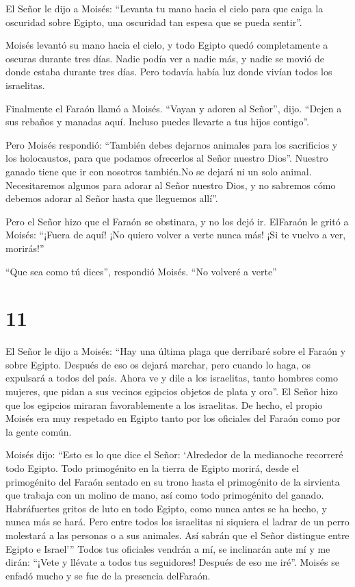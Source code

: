  El Señor le dijo a Moisés: ``Levanta tu mano hacia el
cielo para que caiga la oscuridad sobre Egipto, una oscuridad tan espesa
que se pueda sentir''.

 Moisés levantó su mano hacia el cielo, y todo Egipto quedó
completamente a oscuras durante tres días.  Nadie podía ver
a nadie más, y nadie se movió de donde estaba durante tres días. Pero
todavía había luz donde vivían todos los israelitas.

 Finalmente el Faraón llamó a Moisés. ``Vayan y adoren al
Señor'', dijo. ``Dejen a sus rebaños y manadas aquí. Incluso puedes
llevarte a tus hijos contigo''.

 Pero Moisés respondió: ``También debes dejarnos animales
para los sacrificios y los holocaustos, para que podamos ofrecerlos al
Señor nuestro Dios''.  Nuestro ganado tiene que ir con
nosotros también.No se dejará ni un solo animal. Necesitaremos algunos
para adorar al Señor nuestro Dios, y no sabremos cómo debemos adorar al
Señor hasta que lleguemos allí''.

 Pero el Señor hizo que el Faraón se obstinara, y no los
dejó ir.  ElFaraón le gritó a Moisés: ``¡Fuera de aquí! ¡No
quiero volver a verte nunca más! ¡Si te vuelvo a ver, morirás!''

 ``Que sea como tú dices'', respondió Moisés. ``No volveré
a verte''

\hypertarget{section-10}{%
\section{11}\label{section-10}}

 El Señor le dijo a Moisés: ``Hay una última plaga que
derribaré sobre el Faraón y sobre Egipto. Después de eso os dejará
marchar, pero cuando lo haga, os expulsará a todos del país.
 Ahora ve y dile a los israelitas, tanto hombres como
mujeres, que pidan a sus vecinos egipcios objetos de plata y oro''.
 El Señor hizo que los egipcios miraran favorablemente a los
israelitas. De hecho, el propio Moisés era muy respetado en Egipto tanto
por los oficiales del Faraón como por la gente común.

 Moisés dijo: ``Esto es lo que dice el Señor: `Alrededor de
la medianoche recorreré todo Egipto.  Todo primogénito en la
tierra de Egipto morirá, desde el primogénito del Faraón sentado en su
trono hasta el primogénito de la sirvienta que trabaja con un molino de
mano, así como todo primogénito del ganado.  Habráfuertes
gritos de luto en todo Egipto, como nunca antes se ha hecho, y nunca más
se hará.  Pero entre todos los israelitas ni siquiera el
ladrar de un perro molestará a las personas o a sus animales. Así sabrán
que el Señor distingue entre Egipto e Israel'''  Todos tus
oficiales vendrán a mí, se inclinarán ante mí y me dirán: ``¡Vete y
llévate a todos tus seguidores! Después de eso me iré''. Moisés se
enfadó mucho y se fue de la presencia delFaraón.

